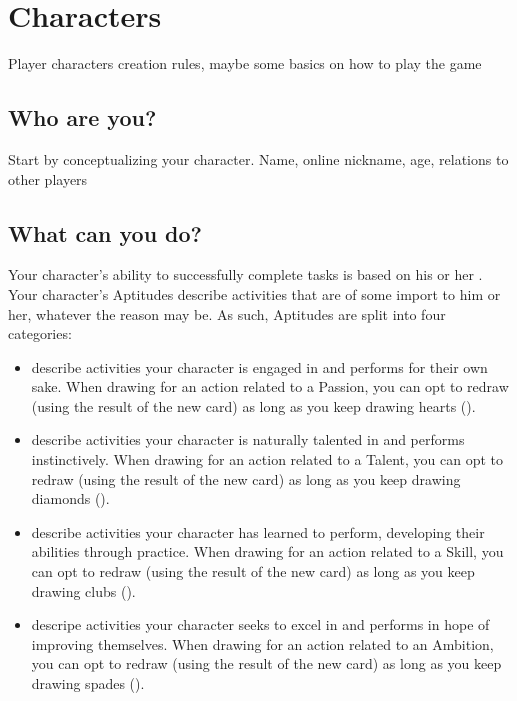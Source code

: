 \chapter{Characters}

Player characters creation rules, maybe some basics on how to play the game

\section{Who are you?}

Start by conceptualizing your character.
Name, online nickname, age, relations to other players

\section{What can you do?}

Your character's ability to successfully complete tasks is based on his or her .
Your character's Aptitudes describe activities that are of some import to him or her, whatever the
reason may be. As such, Aptitudes are split into four categories:
\begin{itemize}
\item {} describe activities your character is engaged in and performs for their own sake.
When drawing for an action related to a Passion, you can opt to redraw (using the result of the new card)
as long as you keep drawing hearts (\heart).

\item {} describe activities your character is naturally talented in and performs instinctively.
When drawing for an action related to a Talent, you can opt to redraw (using the result of the new card)
as long as you keep drawing diamonds (\diamond).

\item {} describe activities your character has learned to perform, developing their abilities
through practice. When drawing for an action related to a Skill, you can opt to redraw (using the result of
the new card) as long as you keep drawing clubs (\club).

\item {} descripe activities your character seeks to excel in and performs in hope of improving
themselves. When drawing for an action related to an Ambition, you can opt to redraw (using the result of the new
card) as long as you keep drawing spades (\spade).
\end{itemize}

